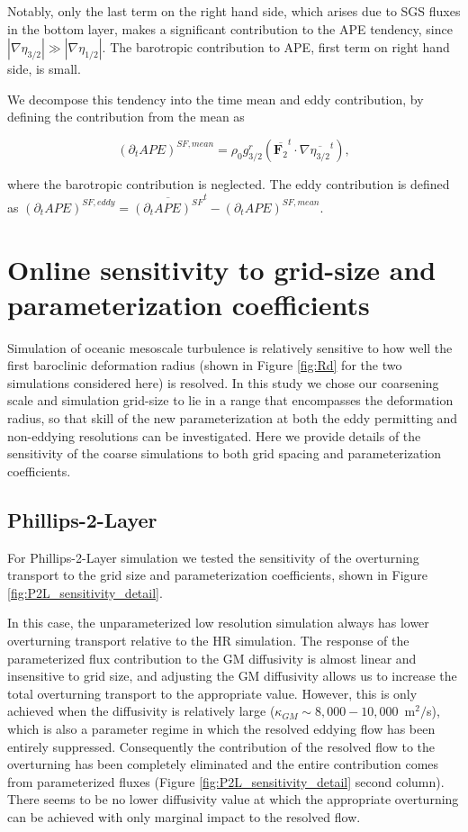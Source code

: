 \documentclass[draft,ms]{agutexSI2019}
\begin{document}
\begin{article}
Notably, only the last term on the right hand side, which arises due to SGS fluxes in the bottom layer, makes a significant contribution to the APE tendency, since $|\nabla \eta_{3/2}| \gg |\nabla \eta_{1/2}|$. The barotropic contribution to APE, first term on right hand side, is small. 

We decompose this tendency into the time mean and eddy contribution, by defining the contribution from the mean as  
 
\begin{equation}
    (\partial_t APE)^{SF, mean} = \rho_0 g^r_{3/2} 
 (\overline{\mathbf{F}_2}^t \cdot \nabla \overline{ \eta_{3/2}}^t),
\end{equation}
 
where the barotropic contribution is neglected. The eddy contribution is defined as $(\partial_t APE)^{SF, eddy} =\overline{(\partial_t APE)^{SF}}^t-(\partial_t APE)^{SF, mean}$.


\section{Online sensitivity to grid-size and parameterization coefficients}
\label{app:online_sensitivity}

Simulation of oceanic mesoscale turbulence is relatively sensitive to how well the first baroclinic deformation radius (shown in Figure \ref{fig:Rd} for the two simulations considered here) is resolved. In this study we chose our coarsening scale and simulation grid-size to lie in a range that encompasses the deformation radius, so that skill of the new parameterization at both the eddy permitting and non-eddying resolutions can be investigated. Here we provide details of the sensitivity of the coarse simulations to both grid spacing and parameterization coefficients. 

\subsection{Phillips-2-Layer}
For Phillips-2-Layer simulation we tested the sensitivity of the overturning transport to the grid size and parameterization coefficients,  shown in Figure %
\ref{fig:P2L_sensitivity_detail}. 

In this case, the unparameterized low resolution simulation always has lower overturning transport relative to the HR simulation. The response of the parameterized flux contribution to the GM diffusivity is almost linear and insensitive to grid size, and adjusting the GM diffusivity allows us to increase the total overturning transport to the appropriate value. However, this is only achieved when the diffusivity is relatively large ($\kappa_{GM}\sim 8,000-10,000$~m$^2/$s), which is also a parameter regime in which the resolved eddying flow has been entirely suppressed. Consequently the contribution of the resolved flow to the overturning has been completely eliminated and the entire contribution comes from parameterized fluxes (Figure \ref{fig:P2L_sensitivity_detail} second column). There seems to be no lower diffusivity value at which the appropriate overturning can be achieved with only marginal impact to the resolved flow. 


\end{article}
\end{document}
